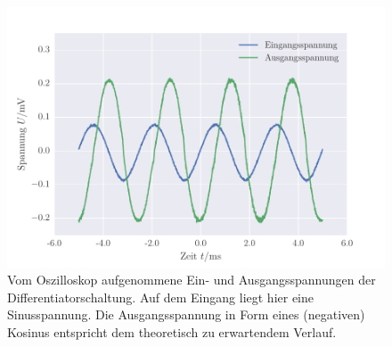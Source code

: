 \FloatBarrier
\begin{figure}[!h]
\centering
\includegraphics[scale=0.75]{../Grafiken/Differentiator_Oszilloskop_Sinus.pdf}
\caption{Vom Oszilloskop aufgenommene Ein- und Ausgangsspannungen der Differentiatorschaltung. Auf dem Eingang
	liegt hier eine Sinusspannung. Die Ausgangsspannung in Form eines (negativen) Kosinus entspricht dem theoretisch
	zu erwartendem Verlauf.\label{fig:differentiator_oszilloskop_sinus}}
\end{figure}
\FloatBarrier